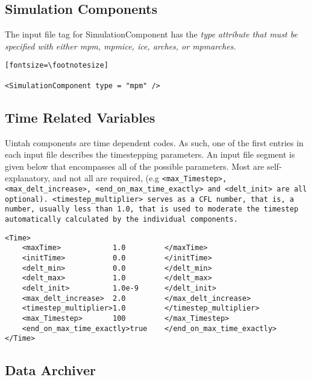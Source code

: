 \subsection{Simulation Components} \label{Sec:SimulationComponent}

The input file tag for SimulationComponent has the \em{type} attribute
that must be specified with either mpm, mpmice, ice, arches, or
mpmarches.

\begin{verbatim}[fontsize=\footnotesize]

<SimulationComponent type = "mpm" />

\end{verbatim}



\subsection{Time Related Variables} \label{Sec:TimeRelatedVariables}
Uintah components are time dependent codes.  As such, one of the first
entries in each input file describes the timestepping parameters.  An
input file segment is given below that encompasses all of the possible
parameters.  Most are self-explanatory, and not all are required, (e.g
\tt <max\_Timestep>, <max\_delt\_increase>,
<end\_on\_max\_time\_exactly> \normalfont and \tt <delt\_init>
\normalfont are all optional).  \tt <timestep\_multiplier> \normalfont
serves as a CFL number, that is, a number, usually less than 1.0, that
is used to moderate the timestep automatically calculated by the
individual components.

\begin{Verbatim}[fontsize=\footnotesize]
<Time>
    <maxTime>            1.0         </maxTime>
    <initTime>           0.0         </initTime>
    <delt_min>           0.0         </delt_min>
    <delt_max>           1.0         </delt_max>
    <delt_init>          1.0e-9      </delt_init>
    <max_delt_increase>  2.0         </max_delt_increase>
    <timestep_multiplier>1.0         </timestep_multiplier>
    <max_Timestep>       100         </max_Timestep>
    <end_on_max_time_exactly>true    </end_on_max_time_exactly>
</Time>
\end{Verbatim}
%
\subsection{Data Archiver} \label{Sec:DataArchiver}


